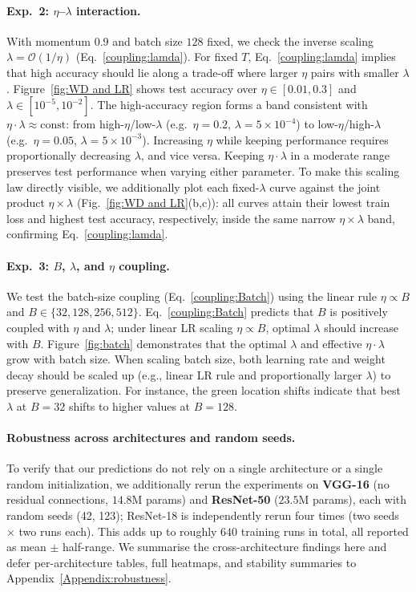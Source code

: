 \paragraph{Exp.\ 2: $\eta$--$\lambda$ interaction.}
With momentum $0.9$ and batch size $128$ fixed, we check the inverse scaling $\lambda =\mathcal{O}( 1/\eta)$ (Eq.~\ref{coupling:lamda}). 
For fixed $T$, Eq.~\eqref{coupling:lamda} implies that high accuracy should lie along a trade-off where larger $\eta$ pairs with smaller $\lambda$. 
Figure~\ref{fig:WD and LR} shows test accuracy over $\eta \in [0.01, 0.3]$ and $\lambda \in [10^{-5}, 10^{-2}]$. 
The high-accuracy region forms a band consistent with $\eta \cdot \lambda \approx \text{const}$: from high-$\eta$/low-$\lambda$ (e.g.\ $\eta{=}0.2$, $\lambda{=}5{\times}10^{-4}$) to low-$\eta$/high-$\lambda$ (e.g.\ $\eta{=}0.05$, $\lambda{=}5{\times}10^{-3}$). 
Increasing $\eta$ while keeping performance requires proportionally decreasing $\lambda$, and vice versa. 
Keeping $\eta \cdot \lambda$ in a moderate range preserves test performance when varying either parameter.
To make this scaling law directly visible, we additionally plot each fixed-$\lambda$ curve against the joint product $\eta\times\lambda$ (Fig.~\ref{fig:WD and LR}(b,c)): all curves attain their lowest train loss and highest test accuracy, respectively, inside the same narrow $\eta\times\lambda$ band, confirming Eq.~\eqref{coupling:lamda}.

\paragraph{Exp.\ 3: $B$, $\lambda$, and $\eta$ coupling.}
We test the batch-size coupling (Eq.~\ref{coupling:Batch}) using the linear rule $\eta \propto B$ and $B \in \{32, 128, 256, 512\}$. 
Eq.~\eqref{coupling:Batch} predicts that $B$ is positively coupled with $\eta$ and $\lambda$; under linear LR scaling $\eta \propto B$, optimal $\lambda$ should increase with $B$. 
Figure~\ref{fig:batch} demonstrates that the optimal $\lambda$ and effective $\eta \cdot \lambda$ grow with batch size. When scaling batch size, both learning rate and weight decay should be scaled up (e.g., linear LR rule and proportionally larger $\lambda$) to preserve generalization.
For instance, the green location shifts indicate that best $\lambda$ at $B{=}32$ shifts to higher values at $B{=}128$.

\paragraph{Robustness across architectures and random seeds.}
To verify that our predictions do not rely on a single architecture or a single random initialization, we additionally rerun the experiments on \textbf{VGG-16} (no residual connections, $14.8$M params) and \textbf{ResNet-50} ($23.5$M params), each with random seeds (42, 123); ResNet-18 is independently rerun four times (two seeds $\times$ two runs each). 
This adds up to roughly $640$ training runs in total, all reported as mean $\pm$ half-range. 
We summarise the cross-architecture findings here and defer per-architecture tables, full heatmaps, and stability summaries to Appendix~\ref{Appendix:robustness}.

